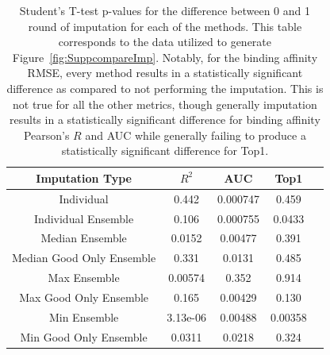 \documentclass[journal=jcisd8,manuscript=article]{achemso}
\begin{document}
\begin{figure}[tbph]
    \label{fig:SuppmedGOEnsOverall}
\end{figure}

\begin{table}
    \centering
    \begin{tabular}{c|c|c|c|c}
    Imputation Type & $R^2$ & AUC & Top1 \\
    \hline
    Individual  & 0.442 & 0.000747 & 0.459 \\
    Individual  Ensemble & 0.106 & 0.000755 & 0.0433 \\
    Median Ensemble & 0.0152 & 0.00477 & 0.391 \\
    Median Good Only Ensemble & 0.331 & 0.0131 & 0.485 \\
    Max Ensemble & 0.00574 & 0.352 & 0.914 \\
    Max Good Only Ensemble & 0.165 & 0.00429 & 0.130 \\
    Min Ensemble & 3.13e-06 & 0.00488 & 0.00358 \\
    Min Good Only Ensemble & 0.0311 & 0.0218 & 0.324 \\
    \end{tabular}
    \caption{Student's T-test p-values for the difference between 0 and 1 round of imputation for each of the methods. This table corresponds to the data utilized to generate Figure~\ref{fig:SuppcompareImp}. Notably, for the binding affinity RMSE, every method results in a statistically significant difference as compared to not performing the imputation. This is not true for all the other metrics, though generally imputation results in a statistically significant difference for binding affinity Pearson's $R$ and AUC while generally failing to produce a statistically significant difference for Top1.}
    \label{tab:SuppImpTypeSignificance}
\end{table}
\end{document}
